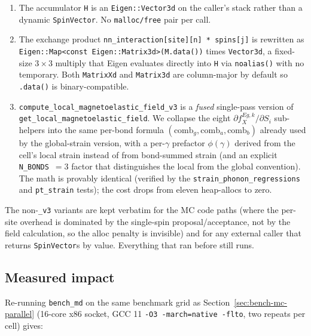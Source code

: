 \documentclass[11pt,letterpaper]{article}
\begin{document}
\begin{enumerate}[noitemsep]
  \item The accumulator \texttt{H} is an \texttt{Eigen::Vector3d} on
        the caller's stack rather than a dynamic
        \texttt{SpinVector}.  No \texttt{malloc/free} pair per call.
  \item The exchange product
        \texttt{nn\_interaction[site][n] * spins[j]} is rewritten as
        \texttt{Eigen::Map<const Eigen::Matrix3d>(M.data())} times
        \texttt{Vector3d}, a fixed-size $3 \times 3$ multiply that
        Eigen evaluates directly into \texttt{H} via
        \texttt{noalias()} with no temporary.  Both
        \texttt{MatrixXd} and \texttt{Matrix3d} are column-major by
        default so \texttt{.data()} is binary-compatible.
  \item \texttt{compute\_local\_magnetoelastic\_field\_v3} is a
        \emph{fused} single-pass version of
        \texttt{get\_local\_magnetoelastic\_field}.  We collapse the
        eight $\partial f_X^{Eg,k}/\partial S_i$ sub-helpers into the
        same per-bond formula
        $(\text{comb}_g, \text{comb}_a, \text{comb}_b)$ already used
        by the global-strain version, with a per-$\gamma$ prefactor
        $\phi(\gamma)$ derived from the cell's local strain instead
        of from bond-summed strain (and an explicit
        \texttt{N\_BONDS}~$=3$ factor that distinguishes the local
        from the global convention).  The math is provably identical
        (verified by the \texttt{strain\_phonon\_regressions} and
        \texttt{pt\_strain} tests); the cost drops from
        eleven heap-allocs to zero.
\end{enumerate}

The non-\texttt{\_v3} variants are kept verbatim for the MC code
paths (where the per-site overhead is dominated by the single-spin
proposal/acceptance, not by the field calculation, so the alloc
penalty is invisible) and for any external caller that returns
\texttt{SpinVector}s by value.  Everything that ran before still
runs.

\subsection{Measured impact}
\label{sec:bench-md-rhs-heap-free}

Re-running \texttt{bench\_md} on the same benchmark grid as
Section~\ref{sec:bench-mc-parallel} (16-core x86 socket, GCC 11
\texttt{-O3 -march=native -flto}, two repeats per cell) gives:
\end{document}
